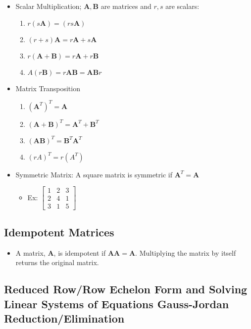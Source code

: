 \begin{itemize}
    \item Scalar Multiplication; $\bm{A}, \bm{B}$ are matrices and $r, s$ are scalars:
    \begin{enumerate}
        \item $r(s\bm{A}) = (rs\bm{A})$
        \item $(r + s)\bm{A} = r\bm{A} + s\bm{A}$
        \item $r(\bm{A} + \bm{B}) = r\bm{A} + r\bm{B}$
        \item $A(r\bm{B}) = r\bm{A}\bm{B} = \bm{A}\bm{B}r$
    \end{enumerate}

    \item Matrix Transposition
    \begin{enumerate}
        \item $(\bm{A}^T)^T = \bm{A}$
        \item $(\bm{A} + \bm{B})^T = \bm{A}^T + \bm{B}^T$
        \item $(\bm{AB})^T = \bm{B}^T\bm{A}^T$
        \item $(rA)^T = r(A^T)$
    \end{enumerate}

    \item Symmetric Matrix: A square matrix is symmetric if $\bm{A}^T = \bm{A}$
    \begin{itemize}
        \item Ex: $
            \begin{bmatrix}
                1 & 2 & 3 \\
                2 & 4 & 1 \\
                3 & 1 & 5
            \end{bmatrix}
            $
    \end{itemize} 
\end{itemize}


\subsection{Idempotent Matrices}

\begin{itemize}
    \item A matrix, $\bm{A}$, is idempotent if $\bm{AA} = \bm{A}$. Multiplying the matrix by itself returns the original matrix.
\end{itemize}


\subsection{Reduced Row/Row Echelon Form and Solving Linear Systems of Equations Gauss-Jordan Reduction/Elimination}


